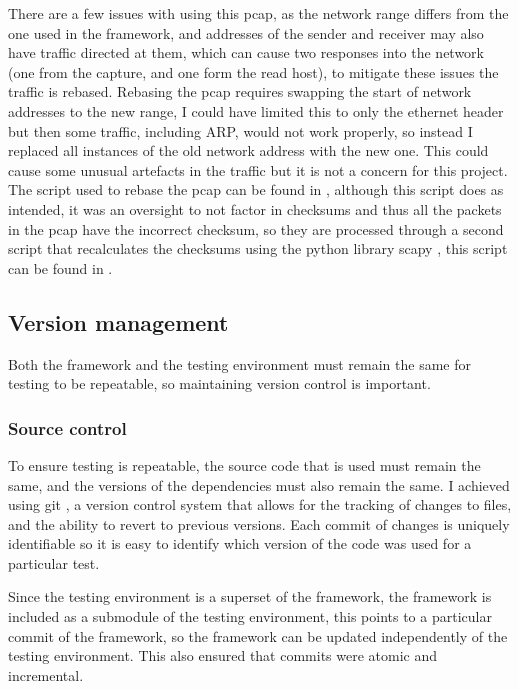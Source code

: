 There are a few issues with using this pcap, as the network range differs from the one used in the framework, and addresses of the sender and receiver may also have traffic directed at them, which can cause two responses into the network (one from the capture, and one form the read host), to mitigate these issues the traffic is rebased. Rebasing the pcap requires swapping the start of network addresses to the new range, I could have limited this to only the ethernet header but then some traffic, including ARP, would not work properly, so instead I replaced all instances of the old network address with the new one. This could cause some unusual artefacts in the traffic but it is not a concern for this project. The script used to rebase the pcap can be found in , although this script does as intended, it was an oversight to not factor in checksums and thus all the packets in the pcap have the incorrect checksum, so they are processed through a second script that recalculates the checksums using the python library scapy \cite{scapy}, this script can be found in .

\subsection{Version management}

Both the framework and the testing environment must remain the same for testing to be repeatable, so maintaining version control is important.

\subsubsection{Source control}

To ensure testing is repeatable, the source code that is used must remain the same, and the versions of the dependencies must also remain the same. I achieved using git \citep{git}, a version control system that allows for the tracking of changes to files, and the ability to revert to previous versions. Each commit of changes is uniquely identifiable so it is easy to identify which version of the code was used for a particular test.

Since the testing environment is a superset of the framework, the framework is included as a submodule of the testing environment, this points to a particular commit of the framework, so the framework can be updated independently of the testing environment. This also ensured that commits were atomic and incremental.

